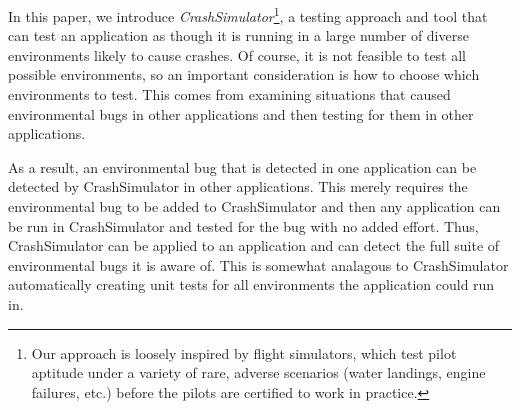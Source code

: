 
%
%

In this paper, we introduce {\em CrashSimulator}\footnote{
Our approach is loosely inspired by flight simulators, which test pilot
aptitude under a variety of rare, adverse scenarios (water landings, 
engine failures, etc.) before the pilots are certified to work in practice.}, 
a testing approach
and tool that can test an application as though it is running in a large number
of diverse environments likely to cause crashes.  Of course, it is not 
feasible to test all possible environments, so an important consideration
is how to choose which environments to test.  This comes from examining 
situations that caused environmental bugs in other applications and then
testing for them in other applications.

As a result, an environmental bug that is detected in one application can be 
detected by CrashSimulator in other applications.  This merely requires the 
environmental bug to be added to CrashSimulator and then any application can
be run in CrashSimulator and tested for the bug with no added effort.  Thus,
CrashSimulator can be applied to an application and can detect the full 
suite of environmental bugs it is aware of.  This is somewhat analagous to
CrashSimulator automatically creating unit tests for all environments the 
application could run in.


